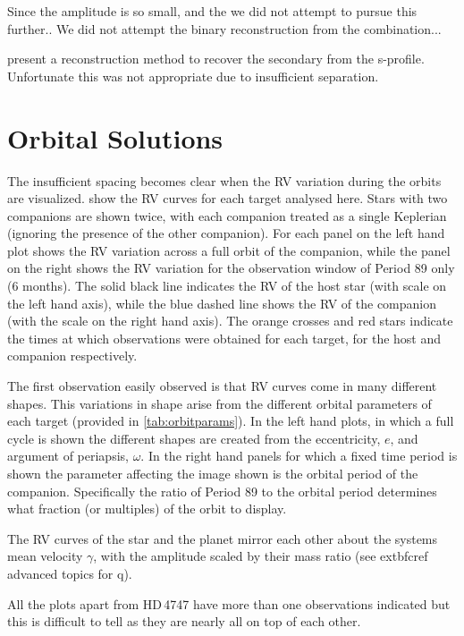 Since the amplitude is so small, and the we did not attempt to pursue this further..
We did not attempt the binary reconstruction from the combination...

\citet{ferluga_separating_1997} present a reconstruction method to recover the secondary from the s-profile.
Unfortunate this was not appropriate due to insufficient separation.


\section{Orbital Solutions}
\label{sec:orbtial_diagrams}
The insufficient spacing becomes clear when the RV variation during the orbits are visualized.
 show the RV curves for each target analysed here.
Stars with two companions are shown twice, with each companion treated as a single Keplerian (ignoring the presence of the other companion).
For each panel on the left hand plot shows the RV variation across a full orbit of the companion, while the panel on the right shows the RV variation for the observation window of Period 89 only (6 months).
The solid black line indicates the RV of the host star (with scale on the left hand axis), while the blue dashed line shows the RV of the companion (with the scale on the right hand axis).
The orange crosses and red stars indicate the times at which observations were obtained for each target, for the host and companion respectively.

The first observation easily observed is that RV curves come in many different shapes.
This variations in shape arise from the different orbital parameters of each target (provided in \cref{tab:orbitparams}).
In the left hand plots, in which a full cycle is shown the different shapes are created from the eccentricity, $e$, and argument of periapsis, $\omega$.
In the right hand panels for which a fixed time period is shown the parameter affecting the image shown is the orbital period of the companion.
Specifically the ratio of Period 89 to the orbital period determines what fraction (or multiples) of the orbit to display.

The RV curves of the star and the planet mirror each other about the systems mean velocity $\gamma$, with the amplitude scaled by their mass ratio (see 	extbf{cref{}} advanced topics for q).

All the plots apart from {HD\,4747} have more than one observations indicated but this is difficult to tell as they are nearly all on top of each other.


